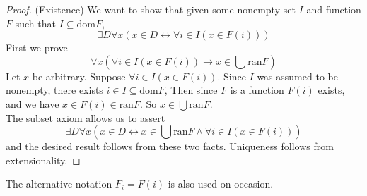 \documentclass{report}
\begin{document}
\begin{proof}(Existence)
We want to show that given some nonempty set $I$ and function $F$ such that $I\subseteq\text{dom}F$,
\begin{equation*}
\exists D\forall x(x\in D\leftrightarrow\forall i\in I(x\in F(i)))
\end{equation*}
First we prove
\begin{equation*}
\forall x(\forall i\in I(x\in F(i))\to x\in\bigcup\text{ran}F)
\end{equation*}
Let $x$ be arbitrary. Suppose $\forall i\in I(x\in F(i))$. Since $I$ was assumed to be nonempty, there exists $i\in I\subseteq\text{dom}F$, 
Then since $F$ is a function $F(i)$ exists, and we have $x\in F(i)\in\text{ran}F$. So $x\in\bigcup\text{ran}F$.\\
\indent The subset axiom allows us to assert
\begin{equation*}
\exists D\forall x(x\in D\leftrightarrow x\in\bigcup\text{ran}F\land\forall i\in I(x\in F(i)))
\end{equation*}
and the desired result follows from these two facts. Uniqueness follows from extensionality.
\end{proof}
\noindent The alternative notation $F_i=F(i)$ is also used on occasion.
\newpage
\end{document}
